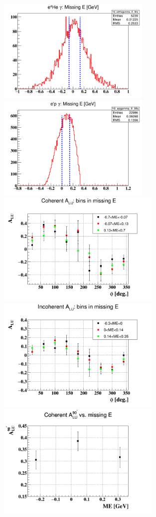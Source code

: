 \begin{figure}[tbp]
   \includegraphics[height=5.0cm]{fig/coh_ME_bins.png}
   \includegraphics[height=5.0cm]{fig/incoh_ME_bins.png}
   \includegraphics[height=5.5cm]{fig/BSA_coherent_ME.png}
   \includegraphics[height=5.5cm]{fig/BSA_incoherent_ME.png}
   \includegraphics[height=5.5cm]{fig/coh_ME_alpha.png}

\end{figure}
